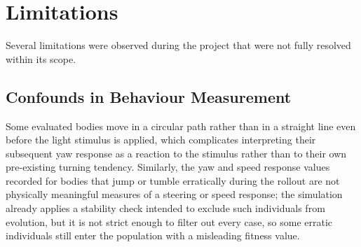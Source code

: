 \documentclass[12pt,a4paper]{report}
\begin{document}
\section{Limitations}
\label{sec:limitations}
Several limitations were observed during the project that were not fully resolved within its scope.

\subsection{Confounds in Behaviour Measurement}
Some evaluated bodies move in a circular path rather than in a straight line even before the light stimulus is applied, which complicates interpreting their subsequent yaw response as a reaction to the stimulus rather than to their own pre-existing turning tendency. Similarly, the yaw and speed response values recorded for bodies that jump or tumble erratically during the rollout are not physically meaningful measures of a steering or speed response; the simulation already applies a stability check intended to exclude such individuals from evolution, but it is not strict enough to filter out every case, so some erratic individuals still enter the population with a misleading fitness value.
\end{document}
